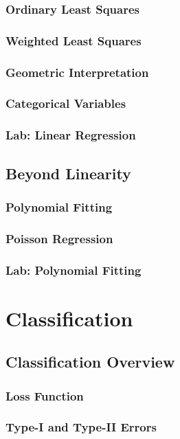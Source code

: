 \documentclass[11pt,fleqn]{book} %
\begin{document}
        \subsection{Ordinary Least Squares}
        \subsection{Weighted Least Squares}
        \subsection{Geometric Interpretation}
        \subsection{Categorical Variables}
        \subsection{Lab: Linear Regression}
        
    \section{Beyond Linearity}
        \subsection{Polynomial Fitting}
        \subsection{Poisson Regression}
        \subsection{Lab: Polynomial Fitting}
    
\chapter{Classification}
    \section{Classification Overview}
        \subsection{Loss Function}
        \subsection{Type-I and Type-II Errors}
\end{document}
